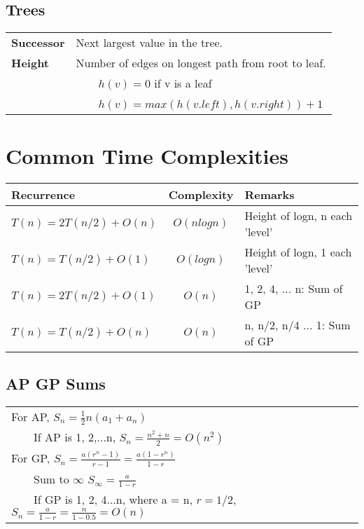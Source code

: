 \documentclass{article}
\newcommand{\tabitem}{~~\llap{\textbullet}~~}
\begin{document}
    \subsection{Trees}

    \begin{tabular}{ll}
        \textbf{Successor} & Next largest value in the tree.\\
        \textbf{Height} & Number of edges on longest path from root to leaf.\\
        & \tabitem $h(v) = 0$ if v is a leaf\\
        & \tabitem $h(v) = max(h(v.left), h(v.right)) + 1$\\
    \end{tabular}

    

    \pagebreak

    \section{Common Time Complexities}


    \begin{tabular}{|l|c|l|}
        \toprule
        \textbf{Recurrence} & \textbf{Complexity} & \textbf{Remarks}\\
        \toprule
        $T(n) = 2T(n/2) + O(n)$ & $O(nlogn)$ & Height of logn, n each 'level'\\
        \midrule
        $T(n) = T(n / 2) + O(1)$ & $O(logn)$ & Height of logn, 1 each 'level'\\
        \midrule
        $T(n) = 2T(n / 2) + O(1)$ & $O(n)$ & 1, 2, 4, ... n: Sum of GP\\
        \midrule
        $T(n) = T(n / 2) + O(n)$ & $O(n)$ & n, n/2, n/4 ... 1: Sum of GP\\ 
        \bottomrule
    \end{tabular}

    \subsection{AP GP Sums}

    \begin{tabular}{l}
        \toprule
        For AP, $S_{n} = \frac{1}{2}n(a_{1} + a_{n})$\\
        \tabitem If AP is 1, 2,...n, $S_{n} = \frac{n^{2} + n}{2} = O(n^{2})$\\
        \midrule
        For GP, $S_{n} = \frac{a(r^{n}-1)}{r-1} = \frac{a(1 - r^{n})}{1- r}$\\
        \tabitem Sum to $\infty$ $S_{\infty} = \frac{a}{1-r}$\\
        \tabitem If GP is 1, 2, 4...n, where a = n, $r = 1/2$, $S_{n} = \frac{a}{1-r} = \frac{n}{1-0.5} = O(n)$\\
    \end{tabular}
\end{document}
